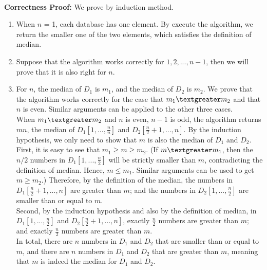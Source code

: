 \documentclass[11pt]{article}
\begin{document}
\begin{CJK*}{UTF8}{gkai}
\begin{algorithm}
\begin{algorithmic}[1]
            \EndFunction
        \end{algorithmic}
    \end{algorithm}

\paragraph{}\textbf{Correctness Proof:} We prove by induction method.\\
\begin{enumerate}[step 1]
    \item  When $n$ = 1, each database has one element. By execute the algorithm, we return the smaller one of the two elements, which satisfies the definition of median.

    \item  Suppose that the algorithm works correctly for $1,2,...,n-1$, then we will prove that it is also right for $n$.
    \item  For $n$, the median of $D_1$ is $m_1$, and the median of $D_2$ is $m_2$. We prove that the algorithm works correctly for the case that $m_1 \textgreater m_2$ and that $n$ is even. Similar arguments can be applied to the other three cases.\\
        When $m_1 \textgreater m_2$ and $n$ is even, $n-1$ is odd, the algorithm returns $mn$, the median of $D_1[1,...,\frac{n}{n}]$ and $D_2[\frac{n}{2}+1,...,n]$. By the induction hypothesis, we only need to show that $m$ is also the median of $D_1$ and $D_2$.\\
        First, it is easy to see that $m_1 \ge m \ge m_2$. (If $m \textgreater m_1$, then the $n/2$ numbers in $D_1[1,...,\frac{n}{2}]$ will be strictly smaller than $m$, contradicting the definition of median. Hence, $m \le m_1$. Similar arguments can be used to get $m \ge m_2$.) Therefore, by the definition of the median, the numbers in $D_1[\frac{n}{2}+1,...,n]$ are greater than $m$; and the numbers in $D_2[1,...,\frac{n}{2}]$ are smaller than or equal to $m$.\\
        Second, by the induction hypothesis and also by the definition of median, in $D_1[1,...,\frac{n}{2}]$ and $D_2[\frac{n}{2}+1,...,n]$, exactly $\frac{n}{2}$ numbers are greater than $m$; and exactly $\frac{n}{2}$ numbers are greater than $m$.\\
        In total, there are $n$ numbers in $D_1$ and $D_2$ that are smaller than or equal to $m$, and there are $n$ numbers in $D_1$ and $D_2$ that are greater than $m$, meaning that $m$ is indeed the median for $D_1$ and $D_2$.
\end{enumerate}


\end{CJK*}
\end{document}
